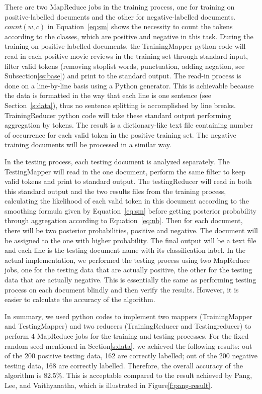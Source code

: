 There are two MapReduce jobs in the training process, one for training
on positive-labelled documents and the other for negative-labelled
documents.  $count(w,c)$ in Equation~\ref{eq:sm} shows the necessity
to count the tokens according to the classes, which are positive and
negative in this task.  During the training on positive-labelled
documents, the TrainingMapper python code will read in each positive
movie reviews in the training set through standard input, filter valid
tokens (removing stoplist words, punctuation, adding negation, see
Subsection\ref{ss:base}) and print to the standard
output. The read-in process is done on a line-by-line basis using a Python 
generator. This is achievable because the data is formatted in the way that 
each line is one sentence (see Section~\ref{s:data}), thus no sentence 
splitting is accomplished by line breaks. TrainingReducer python code will 
take these standard output
performing aggregation by tokens. The result is a dictionary-like text
file containing number of occurrence for each valid token in the
positive training set. The negative training documents will be
processed in a similar way.

In the testing process, each testing document is analyzed
separately. The TestingMapper will read in the one document, perform
the same filter to keep valid tokens and print to standard output. The
testingReducer will read in both this standard output and the two
results files from the training process, calculating the likelihood of
each valid token in this document according to the smoothing formula
given by Equation~\ref{eq:sm} before getting posterior probability
through aggregation according to Equation~\ref{eq:nb}. Then for each
document, there will be two posterior probabilities, positive and
negative. The document will be assigned to the one with higher
probability. The final output will be a text file and each line is the
testing document name with its classification label. In the actual
implementation, we performed the testing process using two MapReduce
jobs, one for the testing data that are actually positive, the other
for the testing data that are actually negative. This is essentially
the same as performing testing process on each document blindly and
then verify the results. However, it is easier to calculate the
accuracy of the algorithm.
 
In summary, we used python codes to implement two mappers
(TrainingMapper and TestingMapper) and two reducers (TrainingReducer
and Testingreducer) to perform 4 MapReduce jobs for the training and
testing processes. For the fixed random seed mentioned in
Section\ref{s:data}, we achieved the following results: out of the 200
positive testing data, 162 are correctly labelled; out of the 200
negative testing data, 168 are correctly labelled. Therefore, the
overall accuracy of the algorithm is 82.5\%. This is acceptable
compared to the result achieved by Pang, Lee, and Vaithyanatha, which
is illustrated in Figure\ref{f:pang-result}.
% 


